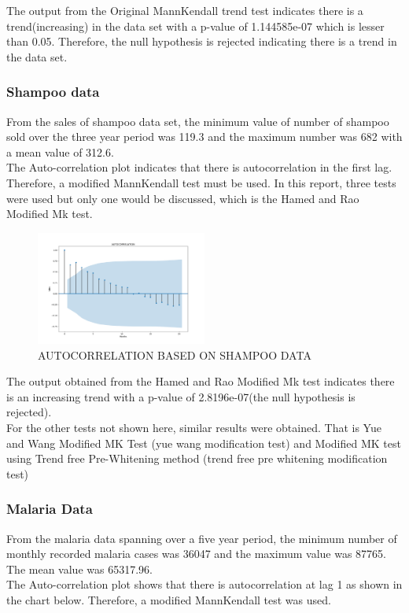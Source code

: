 \documentclass[12pt, letterpaper, twoside]{article}
\begin{document}
The output from the Original MannKendall trend test indicates there is a trend(increasing) in the data set with a p-value of 1.144585e-07 which is lesser than 0.05. Therefore, the null hypothesis is rejected indicating there is a trend in the data set. 

\subsubsection{Shampoo data}
From the sales of shampoo data set, the minimum value of number of shampoo sold over the three year period was 119.3 and the maximum number was 682 with a mean value of 312.6.\\
The Auto-correlation plot indicates that there is autocorrelation in the first lag. Therefore, a modified MannKendall test must be used. In this report, three tests were used but only one would be discussed, which is the Hamed and Rao Modified Mk test.

\begin{figure}
	    \centering
	        \includegraphics[width=0.5\textwidth]{SHAMPOO_DATA_ACF_PLOT.png}
		    \caption{AUTOCORRELATION BASED ON SHAMPOO DATA}
		        \label{fig:2}
\end{figure}

The output obtained from the Hamed and Rao Modified Mk test indicates there is an increasing trend with a p-value of 2.8196e-07(the null hypothesis is rejected).\\ For the other tests not shown here, similar results were obtained. That is Yue and Wang Modified MK Test (yue wang modification test) and Modified MK test using Trend free Pre-Whitening method (trend free pre whitening modification test)\\

\subsubsection{Malaria Data}
From the malaria data spanning over a five year period, the minimum number of monthly recorded malaria cases was 36047 and the maximum value was 87765. The mean value was 65317.96. \\ The Auto-correlation plot shows that there is autocorrelation at lag 1 as shown in the chart below. Therefore, a modified MannKendall test was used.\\
\end{document}
